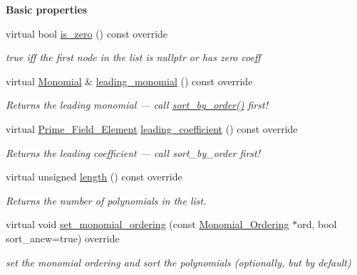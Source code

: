 \begin{Indent}\textbf{ Basic properties}\par
\begin{DoxyCompactItemize}
\item 
\mbox{\label{group__polygroup_a47ca76404bf5c97d1dadbf6c96638ac5}} 
virtual bool \hyperlink{group__polygroup_a47ca76404bf5c97d1dadbf6c96638ac5}{is\+\_\+zero} () const override
\begin{DoxyCompactList}\small\item\em true iff the first node in the list is {\ttfamily nullptr} or has zero coeff \end{DoxyCompactList}\item 
\mbox{\label{group__polygroup_aa2e4fe2b54a3da9074d3708f2a4729b7}} 
virtual \hyperlink{group__polygroup_class_monomial}{Monomial} \& \hyperlink{group__polygroup_aa2e4fe2b54a3da9074d3708f2a4729b7}{leading\+\_\+monomial} () const override
\begin{DoxyCompactList}\small\item\em Returns the leading monomial --- call \hyperlink{group__polygroup_a254bec60707b34bd26ef9d9bb08a4fe9}{sort\+\_\+by\+\_\+order()} first! \end{DoxyCompactList}\item 
\mbox{\label{group__polygroup_a34df585ea11a657b4cfbdf18b6ba8434}} 
virtual \hyperlink{group___fields_group_class_prime___field___element}{Prime\+\_\+\+Field\+\_\+\+Element} \hyperlink{group__polygroup_a34df585ea11a657b4cfbdf18b6ba8434}{leading\+\_\+coefficient} () const override
\begin{DoxyCompactList}\small\item\em Returns the leading coefficient --- call sort\+\_\+by\+\_\+order first! \end{DoxyCompactList}\item 
\mbox{\label{group__polygroup_a5bb88b639d9083ba8c84c576f8aaf0e7}} 
virtual unsigned \hyperlink{group__polygroup_a5bb88b639d9083ba8c84c576f8aaf0e7}{length} () const override
\begin{DoxyCompactList}\small\item\em Returns the number of polynomials in the list. \end{DoxyCompactList}\item 
virtual void \hyperlink{group__polygroup_af9b1dee3a8ca9fb26a6e069ea70ea5df}{set\+\_\+monomial\+\_\+ordering} (const \hyperlink{group__orderinggroup_class_monomial___ordering}{Monomial\+\_\+\+Ordering} $\ast$ord, bool sort\+\_\+anew=true) override
\begin{DoxyCompactList}\small\item\em set the monomial ordering and sort the polynomials (optionally, but by default) \end{DoxyCompactList}\end{DoxyCompactItemize}
\end{Indent}
